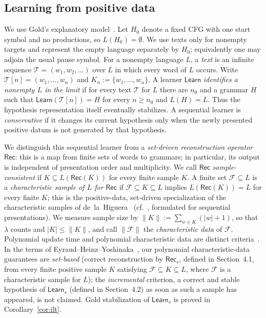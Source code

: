 \documentclass[11pt,a4paper]{article}
\theoremstyle{remark}
\theoremstyle{plain}
\begin{document}
\subsection{Learning from positive data}\label{sec:learning}

We use Gold's explanatory model~\cite{gold1967}.  Let $H_0$ denote a fixed
CFG with one start symbol and no productions, so $L(H_0)=\emptyset$.  We use
texts only for nonempty targets and represent the empty language separately by
$H_0$; equivalently one may adjoin the usual pause symbol.  For a nonempty language $L$, a \emph{text} is an
infinite sequence $\mathcal T=(w_1,w_2,\ldots)$ over $L$ in which every word of $L$
occurs.  Write $\mathcal T[n]=(w_1,\ldots,w_n)$ and
$K_n:=\{w_1,\ldots,w_n\}$.  A learner $\mathsf{Learn}$
\emph{identifies a nonempty $L$ in the limit} if for every text $\mathcal T$ for $L$
there are $n_0$ and a grammar $H$ such that $\mathsf{Learn}(\mathcal T[n])=H$ for every
$n\ge n_0$ and $L(H)=L$.
Thus the hypothesis representation itself eventually stabilizes.  A
sequential learner is \emph{conservative} if it changes its current hypothesis
only when the newly presented positive datum is not generated by that
hypothesis.

We distinguish this sequential learner from a \emph{set-driven reconstruction
operator} $\mathsf{Rec}$: this is a map from finite sets of words to grammars;
in particular, its output is independent of presentation order and multiplicity.
We call $\mathsf{Rec}$
\emph{sample-consistent} if $K\subseteq L(\mathsf{Rec}(K))$ for every finite
sample $K$.  A finite set $\mathcal F\subseteq L$ is a \emph{characteristic sample of $L$ for
$\mathsf{Rec}$} if
$\mathcal F\subseteq K\subseteq L$ implies $L(\mathsf{Rec}(K))=L$ for every finite
$K$; this is the positive-data, set-driven specialization of the
characteristic samples of de~la~Higuera~\cite{higuera1997}
(cf.\ \cite[Section~7.3.3, Definition~7.3.3]{higuera2010}, formulated for
sequential presentations).  We measure sample size by
$\|K\|:=\sum_{w\in K}(|w|+1)$, so that $\lambda$ counts and
$|K|\le\|K\|$, and call $\|\mathcal F\|$ the \emph{characteristic data} of $\mathcal F$.
Polynomial update time and polynomial characteristic data are distinct
criteria~\cite[Sections~7.3.2--7.3.3]{higuera2010}.  In the terms of
Eyraud--Heinz--Yoshinaka~\cite[Definitions~2.5 and~2.8]{eyraud-heinz-yoshinaka2016},
our polynomial characteristic-data guarantees are \emph{set-based}
(correct reconstruction by $\mathsf{Rec}_s$, defined in Section~4.1,
from every finite positive
sample $K$ satisfying $\mathcal F\subseteq K\subseteq L$, where
$\mathcal F$ is a characteristic sample for $L$); the \emph{incremental} criterion,
a correct and stable hypothesis of $\mathsf{Learn}_s$ (defined in Section~4.2)
as soon as such a sample
has appeared, is not claimed.  Gold stabilization of $\mathsf{Learn}_s$ is
proved in Corollary~\ref{cor:ilt}.
\end{document}
